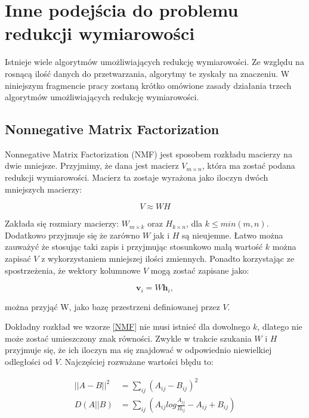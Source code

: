 \documentclass[oneside, eng]{mgr}
\newcommand{\bb}{\textbf}
\begin{document}
\section{Inne podejścia do problemu redukcji wymiarowości}
Istnieje wiele algorytmów umożliwiających redukcję wymiarowości. Ze względu na rosnącą ilość danych do przetwarzania, algorytmy te zyskały na znaczeniu. W niniejszym fragmencie pracy zostaną krótko omówione zasady działania trzech algorytmów umożliwiających redukcję wymiarowości.

\subsection{Nonnegative Matrix Factorization}

Nonnegative Matrix Factorization (NMF) jest sposobem rozkładu macierzy na dwie mniejsze. Przyjmimy, że dana jest macierz $V_{m \times n}$, która ma zostać podana redukcji wymiarowości. Macierz ta zostaje wyrażona jako iloczyn dwóch mniejszych macierzy:

\begin{equation}
	V \approx WH
\label{NMF}
\end{equation}

Zakłada się rozmiary macierzy: $W_{m \times k}$ oraz $H_{k \times n}$, dla $k \leq min(m,n)$. Dodatkowo przyjmuje się że zarówno $W$ jak i $H$ są nieujemne. Łatwo można zauważyć że stosując taki zapis i przyjmując stosunkowo małą wartość $k$ można zapisać $V$ z wykorzystaniem mniejszej ilości zmiennych. Ponadto korzystając ze spostrzeżenia, że wektory kolumnowe $V$ mogą zostać zapisane jako:

\begin{equation}
	\bb{v}_i = W \bb{h}_i,
\end{equation}

można przyjąć W, jako bazę przestrzeni definiowanej przez $V$.

Dokładny rozkład we wzorze \ref{NMF} nie musi istnieć dla dowolnego $k$, dlatego nie może zostać umieszczony znak równości. Zwykle w trakcie szukania $W$ i $H$ przyjmuje się, że ich iloczyn ma się znajdować w odpowiednio niewielkiej odległości od $V$. Najczęściej rozważane wartości błędu to:

\begin{align*}
	||A - B||^2 &= \sum_{ij} (A_{ij} - B_{ij})^2 \\
	  D(A||B)   &= \sum_{ij} (A_{ij} log \frac{A_{ij}}{B_{ij}} - A_{ij} + B_{ij})
\end{align*}
\end{document}
